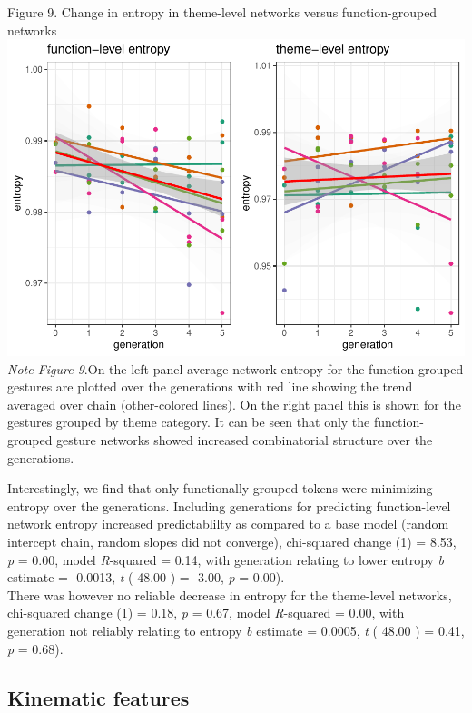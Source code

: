 \documentclass[
  man, noextraspace,floatsintext]{apa6}
\begin{document}
Figure 9. Change in entropy in theme-level networks versus function-grouped networks
\includegraphics{GNet_WP_files/figure-latex/funthemeentropy-1.pdf}
\emph{Note Figure 9}.\small On the left panel average network entropy for the function-grouped gestures are plotted over the generations with red line showing the trend averaged over chain (other-colored lines). On the right panel this is shown for the gestures grouped by theme category. It can be seen that only the function-grouped gesture networks showed increased combinatorial structure over the generations. \normalsize

Interestingly, we find that only functionally grouped tokens were minimizing entropy over the generations. Including generations for predicting function-level network entropy increased predictablilty as compared to a base model (random intercept chain, random slopes did not converge), chi-squared change (1) = 8.53, \emph{p} = 0.00, model \emph{R}-squared = 0.14, with generation relating to lower entropy \emph{b} estimate = -0.0013, \emph{t} ( 48.00 ) = -3.00, \emph{p} = 0.00).\\
There was however no reliable decrease in entropy for the theme-level networks, chi-squared change (1) = 0.18, \emph{p} = 0.67, model \emph{R}-squared = 0.00, with generation not reliably relating to entropy \emph{b} estimate = 0.0005, \emph{t} ( 48.00 ) = 0.41, \emph{p} = 0.68).

\hypertarget{kinematic-features}{%
\subsection{Kinematic features}\label{kinematic-features}}
\end{document}
